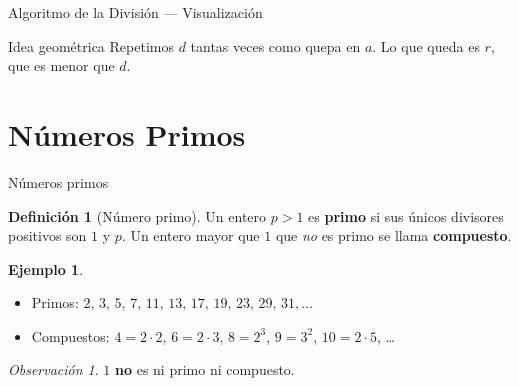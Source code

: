 \documentclass[10pt,aspectratio=169]{beamer}
\theoremstyle{definition}
\newtheorem{definicion}{Definición}
\newtheorem{ejemplo}{Ejemplo}
\theoremstyle{plain}
\theoremstyle{remark}
\newtheorem*{observacion}{Observación}
\begin{document}
\begin{frame}{Algoritmo de la División — Visualización}
  \begin{center}
  \end{center}
  \begin{block}{Idea geométrica}
    Repetimos $d$ tantas veces como quepa en $a$. Lo que queda es $r$,
    que es menor que $d$.
  \end{block}
\end{frame}

\section{Números Primos}
\begin{frame}{Números primos}
  \begin{definicion}[Número primo]
    Un entero $p>1$ es \textbf{primo} si sus únicos divisores positivos
    son $1$ y $p$. Un entero mayor que $1$ que \emph{no} es primo se llama
    \textbf{compuesto}.
  \end{definicion}
  \begin{ejemplo}
    \begin{itemize}
      \item Primos: $2,\,3,\,5,\,7,\,11,\,13,\,17,\,19,\,23,\,29,\,31,\dots$
      \item Compuestos: $4=2\cdot 2$, $6=2\cdot 3$, $8=2^3$,
            $9=3^2$, $10=2\cdot 5$, \ldots
    \end{itemize}
  \end{ejemplo}
  \begin{observacion}
    $1$ \textbf{no} es ni primo ni compuesto.
  \end{observacion}
\end{frame}
\end{document}
